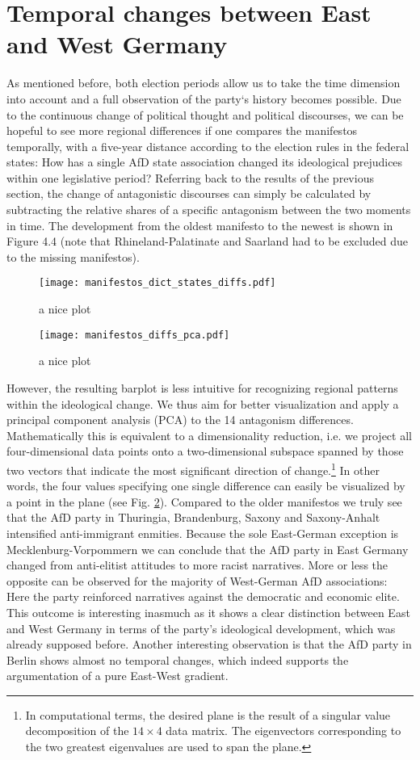 \documentclass[a4paper]{scrreprt}
\begin{document}
\section{Temporal changes between East and West Germany}
As mentioned before, both election periods allow us to take the time dimension into account and a full observation of the party‘s history becomes possible. Due to the continuous change of political thought and political discourses, we can be hopeful to see more regional differences if one compares the manifestos temporally, with a five-year distance according to the election rules in the federal states: How has a single AfD state association changed its ideological prejudices within one legislative period? Referring back to the results of the previous section, the change of antagonistic discourses can simply be calculated by subtracting the relative shares of a specific antagonism between the two moments in time. The development from the oldest manifesto to the newest is shown in Figure 4.4 (note that Rhineland-Palatinate and Saarland had to be excluded due to the missing manifestos).\par
\begin{figure}[ht]
    \centering
    \texttt{[image: manifestos\_dict\_states\_diffs.pdf]}
    \caption{a nice plot}
    \label{fig:fig5}
\end{figure}
\begin{figure}[ht]
    \centering
    \texttt{[image: manifestos\_diffs\_pca.pdf]}
    \caption{a nice plot}
    \label{fig:fig6}
\end{figure}
However, the resulting barplot is less intuitive for recognizing regional patterns within the ideological change. We thus aim for better visualization and apply a principal component analysis (PCA) to the 14 antagonism differences. Mathematically this is equivalent to a dimensionality reduction, i.e. we project all four-dimensional data points onto a two-dimensional subspace spanned by those two vectors that indicate the most significant direction of change.\footnote{In computational terms, the desired plane is the result of a singular value decomposition of the $14\times 4$ data matrix. The eigenvectors corresponding to the two greatest eigenvalues are used to span the plane.} In other words, the four values specifying one single difference can easily be visualized by a point in the plane (see Fig. \ref{fig:fig6}). Compared to the older manifestos we truly see that the AfD party in Thuringia, Brandenburg, Saxony and Saxony-Anhalt intensified anti-immigrant enmities. Because the sole East-German exception is Mecklenburg-Vorpommern we can conclude that the AfD party in East Germany changed from anti-elitist attitudes to more racist narratives. More or less the opposite can be observed for the majority of West-German AfD associations: Here the party reinforced narratives against the democratic and economic elite. This outcome is interesting inasmuch as it shows a clear distinction between East and West Germany in terms of the party's ideological development, which was already supposed before. Another interesting observation is that the AfD party in Berlin shows almost no temporal changes, which indeed supports the argumentation of a pure East-West gradient.\par
\end{document}
